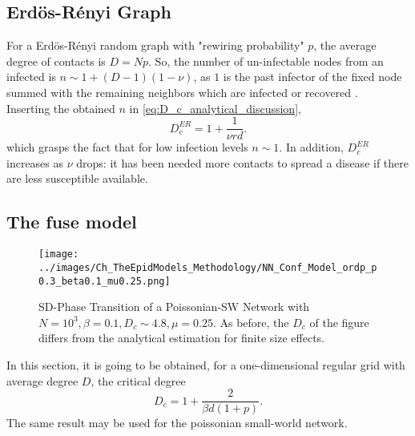 \documentclass[a4paper,12pt,twoside]{book} %
\theoremstyle{definition}
\begin{document}
\subsection*{Erdös-Rényi Graph}
For a Erdös-Rényi random graph with "rewiring probability" $p$, the average degree of contacts is $D = Np$. So, the number of un-infectable nodes from an infected is $n \sim 1 + (D-1)(1-\nu)$, as $1$ is the past infector of the fixed node summed with the remaining neighbors which are infected or recovered \cite{Thurner::Appendix_NetBasedExpl}. 
\\Inserting the obtained $n$ in \autoref{eq:D_c_analytical_discussion}, 
\begin{equation}
	D_c^{ER} = 1 + \frac{1}{\nu rd}.
\end{equation}
which grasps the fact that for low infection levels $n\sim1$. 
In addition, $D_c^{ER}$ increases as $\nu$ drops: it has been needed more contacts to spread a disease if there are less susceptible available.  

\subsection*{The fuse model}
\begin{figure}[t]
	\texttt{[image: ../images/Ch\_TheEpidModels\_Methodology/NN\_Conf\_Model\_ordp\_p0.3\_beta0.1\_mu0.25.png]}
	\centering
	\caption{SD-Phase Transition of a Poissonian-SW Network with $N = 10^{3}, \beta = 0.1, D_c \sim 4.8, \mu = 0.25$. As before, the $D_c$ of the figure differs from the analytical estimation for finite size effects.}
	\label{fig:SD_Threshold_Fuse_Model}
\end{figure}

In this section, it is going to be obtained, for a one-dimensional regular grid with average degree $D$, the critical degree \cite{Thurner::NetBasedExpl} 
\begin{equation}
	D_c = 1 + \frac{2}{\beta d(1+p)}.
	\label{eq:Dc_PSW_network}
\end{equation}
The same result may be used for the poissonian small-world network.
\end{document}
